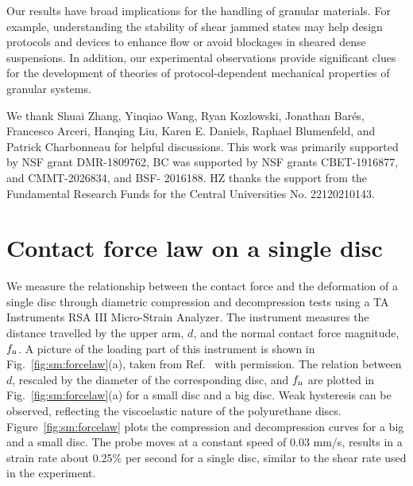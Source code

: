 \documentclass[twocolumn,showkeys,superscriptaddress,preprintnumbers,amsmath,amssymb,showpacs,prx,longbibliography]{revtex4-2}
\begin{document}
\begin{CJK*}{UTF8}{gbsn}
Our results have broad implications for the handling of granular materials. For example, understanding the stability of shear jammed states may help design protocols and devices to enhance flow or avoid blockages in sheared dense suspensions. In addition, our experimental observations provide significant clues for the development of theories of  protocol-dependent mechanical properties of granular systems.


\end{CJK*}
\begin{acknowledgments}
We thank Shuai Zhang, Yinqiao Wang, Ryan Kozlowski, Jonathan Bar\'{e}s, Francesco Arceri, Hanqing Liu, Karen E. Daniels, Raphael Blumenfeld, and Patrick Charbonneau for helpful discussions. This work was primarily supported by NSF grant DMR-1809762, BC was supported by NSF grants CBET-1916877, and CMMT-2026834, and BSF-
2016188. HZ thanks the support from the Fundamental Research Funds for the Central Universities No. 22120210143.
\end{acknowledgments}



\appendix

\section{Contact force law on a single disc}\label{app_deflection}

We measure the relationship between the contact force and the deformation of a single disc through diametric compression and decompression tests using a TA Instruments RSA III Micro-Strain Analyzer. The instrument measures the distance travelled by the upper arm, $d$, and the normal contact force magnitude, $f_{\rm n}$. A picture of the loading part of this instrument is shown in Fig.~\ref{fig:sm:forcelaw}(a), taken from Ref.~\cite{zhao2020_phd} with permission. The relation between $d$, rescaled by the diameter of the corresponding disc, and $f_{\rm n}$ are plotted in Fig.~\ref{fig:sm:forcelaw}(a) for a small disc and a big disc. Weak hysteresis can be observed, reflecting the viscoelastic nature of the polyurethane discs. Figure~\ref{fig:sm:forcelaw} plots the compression and decompression curves for a big and a small disc. The probe moves at a constant speed of 0.03 mm/s, results in a strain rate about 0.25\% per second for a single disc, similar to the shear rate used in the experiment.
\end{document}
